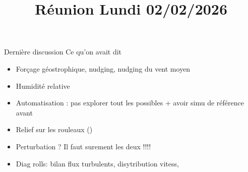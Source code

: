

\graphicspath{{FIGURES/}}

\title{Réunion Lundi 02/02/2026}
\author{}

\usepackage[caption = false]{subfig}

\begin{frame}
\maketitle
\end{frame}

\begin{frame}{Dernière discussion}
Ce qu'on avait dit
  \begin{itemize}
    \item Forçage géostrophique, nudging, nudging du vent moyen
    \item Humidité relative 
    \item Automatisation : pas explorer tout les possibles + avoir simu de référence avant
    \item Relief sur les rouleaux (\cite{swathiUniqueRollClouds2025})
    \item Perturbation ? Il faut surement les deux !!!!
    \item Diag rolls: bilan flux turbulents, disytribution vitess, 
  \end{itemize}
\end{frame}


